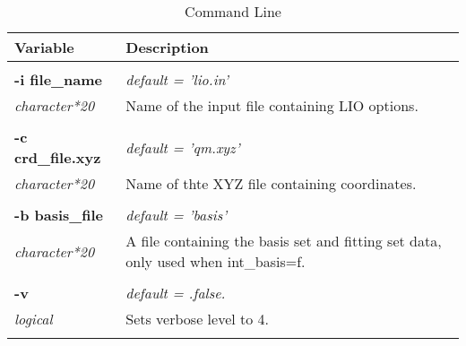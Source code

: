 \begin{Spacing}{1.0}
   \begin{longtable}{ p{} p{} }
   
      \toprule
      \textbf{Variable} & Description \\*
      \midrule \\*
      \endhead
   
      \bottomrule
      \caption{Command Line}
      \endfoot

      \textbf{-i file\_name}
      &  \textit{default = 'lio.in' }
      \\*\textit{character*20}
      & Name of the input file containing LIO options. \\* \\

      \textbf{-c crd\_file.xyz}
      &  \textit{default = 'qm.xyz' }
      \\*\textit{character*20}
      & Name of thte XYZ file containing coordinates. \\* \\
      
      \textbf{-b basis\_file}
      &  \textit{default = 'basis' }
      \\*\textit{character*20}
      & A file containing the basis set and fitting set data,
      only used when int\_basis=f. \\* \\

      \textbf{-v}
      &  \textit{default = .false. }
      \\*\textit{logical}
      & Sets verbose level to 4.\\* \\
   
   
   \end{longtable}
\end{Spacing}
   